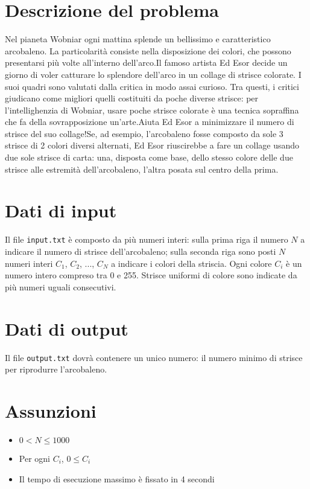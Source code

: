 \documentclass[a4paper,11pt]{article}
\begin{document}
\vspace{0.5cm}



\section*{Descrizione del problema}
  Nel pianeta Wobniar ogni mattina splende un bellissimo e caratteristico
arcobaleno. La particolarità consiste nella disposizione dei colori, che
possono presentarsi più volte all'interno dell'arco.Il famoso artista Ed Esor decide un giorno di voler catturare lo
splendore dell'arco in un collage di strisce colorate.
I suoi quadri sono valutati dalla critica in modo assai curioso. Tra
questi, i critici giudicano come migliori quelli
costituiti da poche diverse strisce: per
l'intellighenzia di Wobniar, usare poche strisce colorate è una tecnica
sopraffina che fa della sovrapposizione un'arte.Aiuta Ed Esor a minimizzare il numero di strisce del suo collage!Se, ad esempio, l'arcobaleno fosse composto da sole 3 strisce di 2
colori diversi alternati, Ed Esor riuscirebbe a fare un collage usando
due sole strisce di carta: una, disposta come base, dello stesso
colore delle due strisce alle estremità dell'arcobaleno, l'altra
posata sul centro della prima.

\section*{Dati di input}
  Il file \texttt{input.txt} è composto da
più numeri interi: sulla prima riga il numero $N$ a indicare il
numero di strisce dell'arcobaleno; sulla seconda riga sono posti $N$
numeri interi $C_{1}$, $C_{2}$, ..., $C_{N}$
a indicare i colori della striscia.
Ogni colore $C_{i}$ è un numero
intero compreso tra 0 e 255.
Strisce uniformi di colore sono indicate da più numeri uguali
consecutivi.

\section*{Dati di output}
  Il file \texttt{output.txt} dovrà contenere un
unico numero: il numero minimo di strisce per riprodurre l'arcobaleno.
  \section*{Assunzioni}
  \begin{itemize}
  
    \item $0 < N ≤ 1000$
    \item Per ogni $C_{i}$, $0 ≤
C_{i}$
    \item Il tempo di esecuzione massimo è fissato in 4 secondi
  \end{itemize}
\end{document}
